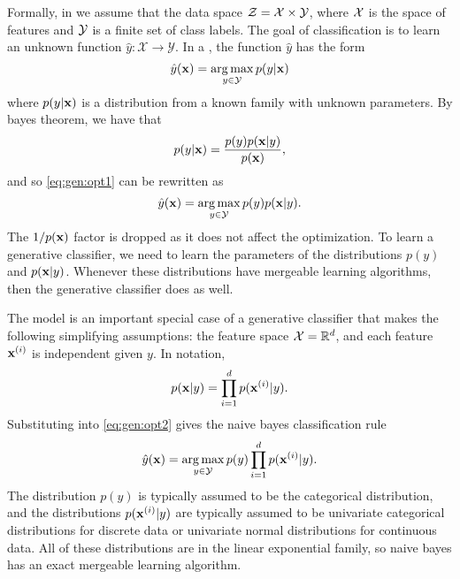 \documentclass[thesis.tex]{subfiles}
\newcommand{\set}[1]{\mathcal {#1}}
\begin{document}
Formally, in  we assume that the data space ${\mathcal Z}={\mathcal X}\times {\mathcal Y}$,
where ${\mathcal X}$ is the space of features and ${\mathcal Y}$ is a finite set of class labels.
The goal of classification is to learn an unknown function $\hat y : \set X \to \set Y$.
In a , the function $\hat y$ has the form
\begin{equation}
    \label{eq:gen:opt1}
    \hat y(\mathbf{x}) 
    =
    \operatorname*{arg\,max}_{y\in{\mathcal Y}} p(y | \mathbf{x})
    \end{equation}
where $p(y | \mathbf{x})$ is a distribution from a known family with unknown parameters.
By bayes theorem, we have that
\begin{equation}
    \label{eq:gen:bayes}
    p(y | \mathbf{x}) = \frac{p(y)p(\mathbf{x} | y)}{p(\mathbf{x})}
    ,
\end{equation}
and so \eqref{eq:gen:opt1} can be rewritten as
\begin{equation}
    \label{eq:gen:opt2}
    \hat y(\mathbf{x}) 
    =
    \operatorname*{arg\,max}_{y\in{\mathcal Y}} p(y)p(\mathbf{x} | y)
    .
\end{equation}
The $1/p(\mathbf{x})$ factor is dropped as it does not affect the optimization.
To learn a generative classifier,
we need to learn the parameters of the distributions $p(y)$ and $p(\mathbf{x}|y)$.
Whenever these distributions have mergeable learning algorithms,
then the generative classifier does as well.

The  model is an important special case of a generative classifier that makes the following simplifying assumptions:
the feature space ${\mathcal X}=\mathbb R^d$, 
and each feature $\mathbf{x}^{(i)}$ is independent given $y$.
In notation,
\begin{equation}
    p(\mathbf{x}|y) = \prod_{i=1}^d p(\mathbf{x}^{(i)}|y)
    .
\end{equation}
Substituting into \eqref{eq:gen:opt2} gives the naive bayes classification rule
\begin{equation}
    \label{eq:gen:nb}
    \hat y(\mathbf{x}) 
    =
    \operatorname*{arg\,max}_{y\in{\mathcal Y}} p(y)\prod_{i=1}^dp(\mathbf{x}^{(i)} | y)
    .
\end{equation}
The distribution $p(y)$ is typically assumed to be the categorical distribution,
and the distributions $p(\mathbf{x}^{(i)}|y)$ are typically assumed to be univariate categorical distributions for discrete data or univariate normal distributions for continuous data.
All of these distributions are in the linear exponential family,
so naive bayes has an exact mergeable learning algorithm.
\end{document}
